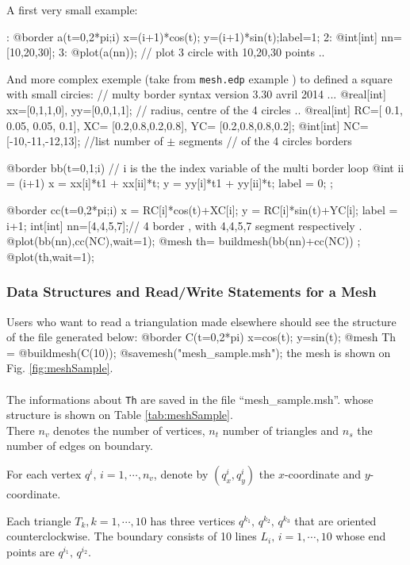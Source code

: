 \documentclass[a4paper,twoside,12pt]{book}
\begin{document}
\medskip A first very small example: 

: @border a(t=0,2*pi;i){ x=(i+1)*cos(t); y=(i+1)*sin(t);label=1;} 
2: @int[int] nn=[10,20,30]; 
3: @plot(a(nn)); //  plot 3 circle with 10,20,30 points ..
\eFF 

And  more complex exemple (take from \texttt{mesh.edp} example )  to defined a square with small circies: 
\bFF
// multy border syntax version 3.30 avril 2014 ... 
  @real[int] xx=[0,1,1,0],
            yy=[0,0,1,1];
  // radius, centre of the 4 circles .. 
  @real[int] RC=[ 0.1, 0.05, 0.05, 0.1],
            XC= [0.2,0.8,0.2,0.8],
            YC= [0.2,0.8,0.8,0.2];
  @int[int]  NC=[-10,-11,-12,13]; //list number of $\pm$ segments
  // of the 4 circles borders  

  @border bb(t=0,1;i) 
  {
  // i is the the index variable of the multi border loop 
    @int ii = (i+1)%
    x =  xx[i]*t1 + xx[ii]*t;
    y =  yy[i]*t1 + yy[ii]*t;
    label = 0; ; 
  }
  
  @border cc(t=0,2*pi;i) 
 {
    x = RC[i]*cos(t)+XC[i];
    y = RC[i]*sin(t)+YC[i];
    label = i+1; 
  }
  int[int] nn=[4,4,5,7];// 4 border , with 4,4,5,7 segment respectively . 
  @plot(bb(nn),cc(NC),wait=1);
  @mesh th= buildmesh(bb(nn)+cc(NC)) ; 
  @plot(th,wait=1); 
\eFF


\subsubsection{Data Structures and Read/Write Statements for a Mesh}

Users who want to read a triangulation made elsewhere should see the structure
of the file generated below:
\bFF
@border C(t=0,2*pi) { x=cos(t); y=sin(t); }
@mesh Th = @buildmesh(C(10));
@savemesh("mesh_sample.msh");
\eFF
the mesh is shown on Fig. \ref{fig:meshSample}.
\\\\
The informations about \texttt{Th} are saved in the file ``mesh\_sample.msh''.
whose structure is shown on Table \ref{tab:meshSample}.
\\
There $n_v$ denotes
the number of vertices, $n_t$ number of triangles
and $n_s$ the number of edges on boundary.

For each vertex $q^i,\, i=1,\cdots,n_v$, denote   by $(q^i_x,q^i_y)$
the $x$-coordinate and $y$-coordinate.

Each triangle $T_k, k=1,\cdots,10$ has three vertices $q^{k_1},\, q^{k_2},\,q^{k_3}$
that are oriented counterclockwise.
The boundary consists of 10 lines $L_i,\, i=1,\cdots,10$ whose end points are
$q^{i_1},\, q^{i_2}$.
\end{document}
